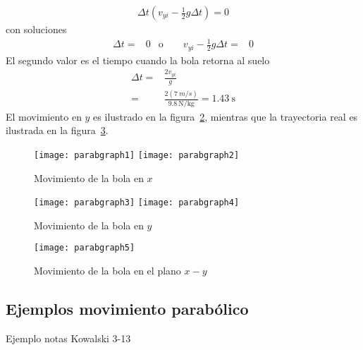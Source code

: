 \begin{itemize}
\begin{itemize}
\begin{align*}
 \Delta t(v_{yi}-\frac{1}{2}g\Delta t)=0   
  \end{align*}
con soluciones
  \begin{align}
    \Delta t=&0 &\text{o}\qquad v_{yi}-\frac{1}{2}g\Delta t=&0
  \end{align}
El segundo valor es el tiempo cuando la bola retorna al suelo
\begin{align}
  \Delta t=&\frac{2 v_{yi}}{g}\nonumber\\
=&\frac{2(\SI{7}{m/s})}{\SI{9.8}{\newton\per\kilo\gram}} =\SI{1.43}\ \text{s}
\end{align}
El movimiento en $y$ es ilustrado en la figura~\ref{fig:parabgraph3}, mientras que la trayectoria real es ilustrada en la figura~\ref{fig:parabgraph5}.
\end{itemize}

\end{itemize}



\begin{frame}
\begin{figure}
  \centering
  \texttt{[image: parabgraph1]} \texttt{[image: parabgraph2]}
  \caption{Movimiento de la bola en $x$}
  \label{fig:parabgraph1}
\end{figure}
\end{frame}

\begin{frame}
\begin{figure}
  \centering
  \texttt{[image: parabgraph3]}  \texttt{[image: parabgraph4]}
  \caption{Movimiento de la bola en $y$}
  \label{fig:parabgraph3}
\end{figure}
\end{frame}

\begin{frame}
\begin{figure}
  \centering
  \texttt{[image: parabgraph5]}
  \caption{Movimiento de la bola en el plano $x-y$}
  \label{fig:parabgraph5}
\end{figure}
\end{frame}

\subsection{Ejemplos movimiento parabólico}

\begin{inprogress}
  Ejemplo notas Kowalski 3-13
\end{inprogress}

